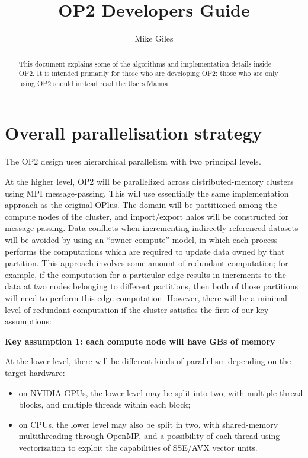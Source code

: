 \documentclass[12pt]{article}
\begin{document}
\title{OP2 Developers Guide}
\author{Mike Giles}

\maketitle

\begin{abstract}
This document explains some of the algorithms and implementation
details inside OP2.  It is intended primarily for those who are
developing OP2; those who are only using OP2 should instead read 
the Users Manual.  
\vspace*{0.2in}
\end{abstract}


\tableofcontents

\newpage

\section{Overall parallelisation strategy}

The OP2 design uses hierarchical parallelism with two principal levels.

At the higher level, OP2 will be parallelized across distributed-memory
clusters using MPI message-passing.  This will use essentially the same 
implementation approach as the original OPlus.  The domain will be 
partitioned among the compute nodes of the cluster, and import/export 
halos will be constructed for message-passing.  Data conflicts when 
incrementing indirectly referenced datasets will be avoided by using an
``owner-compute'' model, in which each process performs the computations
which are required to update data owned by that partition.  This approach
involves some amount of redundant computation; for example, if the 
computation for a particular edge results in increments to the data at 
two nodes belonging to different partitions, then both of those partitions 
will need to perform this edge computation.  However, there will be a 
minimal level of redundant computation if the cluster satisfies the first
of our key assumptions:

\vspace{0.1in}
{\bf Key assumption 1: each compute node will have GBs of memory}
\vspace{0.1in}

At the lower level, there will be different kinds of parallelism depending
on the target hardware:
\begin{itemize}
\item
on NVIDIA GPUs, the lower level may be split into two, with multiple 
thread blocks, and multiple threads within each block;
\item
on CPUs, the lower level may also be split in two, with shared-memory
multithreading through OpenMP, and a possibility of each thread using
vectorization to exploit the capabilities of SSE/AVX vector units.
\end{itemize}
\end{document}
